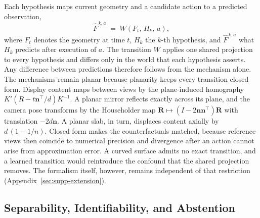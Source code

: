 \documentclass{article} %
\theoremstyle{defstyle}
\theoremstyle{plain}
\begin{document}
Each hypothesis maps current geometry and a candidate action to a predicted observation,
\begin{equation}
\label{eq:transition}
\hat{F}^{\,k,a} \;=\; W\!\left(F_t,\, H_k,\, a\right),
\end{equation}
where $F_t$ denotes the geometry at time $t$, $H_k$ the $k$-th hypothesis, and
$\hat{F}^{\,k,a}$ what $H_k$ predicts after execution of $a$. The transition $W$ applies one
shared projection to every hypothesis and differs only in the world that each hypothesis
asserts. Any difference between predictions therefore follows from the mechanism alone. The
mechanisms remain planar because planarity keeps every transition closed form. Display content
maps between views by the plane-induced homography $K'(R - t\mathbf{n}^{\top}/d)K^{-1}$. A
planar mirror reflects exactly across its plane, and the camera pose transforms by the
Householder map $\mathbf{R} \mapsto (I - 2\mathbf{n}\mathbf{n}^{\top})\mathbf{R}$ with
translation $-2d\mathbf{n}$. A planar slab, in turn, displaces content axially by $d\,(1 -
1/n)$. Closed form makes the counterfactuals matched, because reference views then
coincide to numerical precision and divergence after an action cannot arise from approximation
error. A curved surface admits no exact transition, and a learned transition would reintroduce
the confound that the shared projection removes. The formalism itself, however, remains
independent of that restriction (Appendix~\ref{sec:supp-extension}).

\subsection{Separability, Identifiability, and Abstention}
\label{sec:separability}
\end{document}
